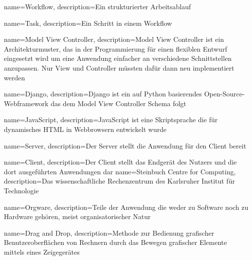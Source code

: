 
%


{
    name=Workflow,
    description={Ein strukturierter Arbeitsablauf}
}

{
    name=Task,
    description={Ein Schritt in einem Workflow}
}





{
    name=Model View Controller,
    description={Model View Controller ist ein Architekturmuster, das in der Programmierung für einen flexiblen Entwurf eingesetzt wird um eine Anwendung einfacher an verschiedene Schnittstellen anzupassen. Nur View und Controller müssten dafür dann neu implementiert werden}
}

{
    name=Django,
    description={Django ist ein auf Python basierendes Open-Source-Webframework das dem \Gls{Model View Controller} Schema folgt}
}

{
    name=JavaScript,
    description={JavaScript ist eine Skriptsprache die für dynamisches HTML in Webbrowsern entwickelt wurde}
}

{
    name=Server,
    description={Der Server stellt die Anwendung für den Client bereit}
}

{
    name=Client,
    description={Der Client stellt das Endgerät des Nutzers und die dort ausgeführten Anwendungen dar}
}
{
    name=Steinbuch Centre for Computing,
    description={Das wissenschaftliche Rechenzentrum des Karlsruher Institut für Technologie}
}

{
    name=Orgware,
    description={Teile der Anwendung die weder zu Software noch zu Hardware gehören, meist organisatorischer Natur}
}


{
    name=Drag and Drop,
    description={Methode zur Bedienung grafischer Benutzeroberflächen von Rechnern durch das Bewegen grafischer Elemente mittels eines Zeigegerätes}
}

